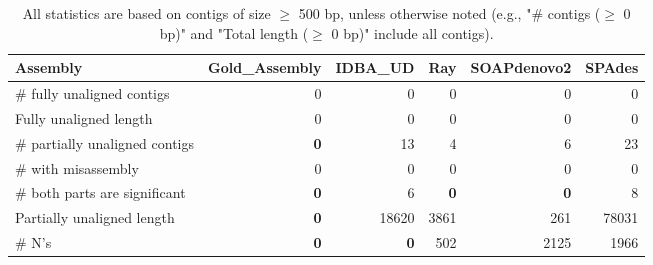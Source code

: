 \documentclass[12pt,a4paper]{article}
\begin{document}
\begin{table}[ht]
\begin{center}
\caption{All statistics are based on contigs of size $\geq$ 500 bp, unless otherwise noted (e.g., "\# contigs ($\geq$ 0 bp)" and "Total length ($\geq$ 0 bp)" include all contigs).}
\begin{tabular}{|l*{5}{|r}|}
\hline
Assembly & Gold\_Assembly & IDBA\_UD & Ray & SOAPdenovo2 & SPAdes \\ \hline
\# fully unaligned contigs & 0 & 0 & 0 & 0 & 0 \\ \hline
Fully unaligned length & 0 & 0 & 0 & 0 & 0 \\ \hline
\# partially unaligned contigs & {\bf 0} & 13 & 4 & 6 & 23 \\ \hline
\hspace{5mm}\# with misassembly & 0 & 0 & 0 & 0 & 0 \\ \hline
\hspace{5mm}\# both parts are significant & {\bf 0} & 6 & {\bf 0} & {\bf 0} & 8 \\ \hline
Partially unaligned length & {\bf 0} & 18620 & 3861 & 261 & 78031 \\ \hline
\# N's & {\bf 0} & {\bf 0} & 502 & 2125 & 1966 \\ \hline
\end{tabular}
\end{center}
\end{table}
\end{document}
